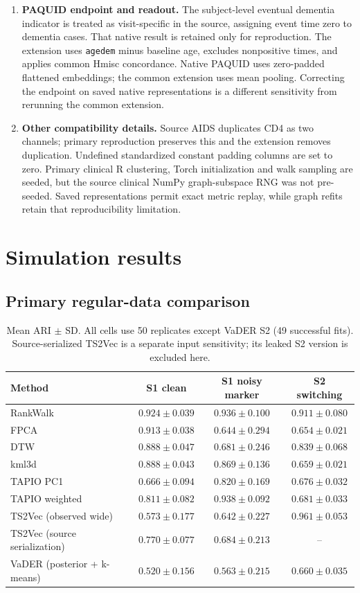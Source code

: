 \documentclass[11pt,a4paper]{article}
\begin{document}
\begin{enumerate}
\item \textbf{PAQUID endpoint and readout.} The subject-level eventual dementia indicator is treated as visit-specific in the source, assigning event time zero to dementia cases. That native result is retained only for reproduction. The extension uses \texttt{agedem} minus baseline age, excludes nonpositive times, and applies common Hmisc concordance. Native PAQUID uses zero-padded flattened embeddings; the common extension uses mean pooling. Correcting the endpoint on saved native representations is a different sensitivity from rerunning the common extension.
\item \textbf{Other compatibility details.} Source AIDS duplicates CD4 as two channels; primary reproduction preserves this and the extension removes duplication. Undefined standardized constant padding columns are set to zero. Primary clinical R clustering, Torch initialization and walk sampling are seeded, but the source clinical NumPy graph-subspace RNG was not pre-seeded. Saved representations permit exact metric replay, while graph refits retain that reproducibility limitation.
\end{enumerate}

\section{Simulation results}
\subsection{Primary regular-data comparison}


\begin{table}[htbp]
\centering\small
\caption{Mean ARI $\pm$ SD. All cells use 50 replicates except VaDER S2 (49 successful fits). Source-serialized TS2Vec is a separate input sensitivity; its leaked S2 version is excluded here.}
\begin{tabular}{lccc}\toprule
Method & S1 clean & S1 noisy marker & S2 switching \\ \midrule
RankWalk & $0.924 \pm 0.039$ & $0.936 \pm 0.100$ & $0.911 \pm 0.080$ \\
FPCA & $0.913 \pm 0.038$ & $0.644 \pm 0.294$ & $0.654 \pm 0.021$ \\
DTW & $0.888 \pm 0.047$ & $0.681 \pm 0.246$ & $0.839 \pm 0.068$ \\
kml3d & $0.888 \pm 0.043$ & $0.869 \pm 0.136$ & $0.659 \pm 0.021$ \\
TAPIO PC1 & $0.666 \pm 0.094$ & $0.820 \pm 0.169$ & $0.676 \pm 0.032$ \\
TAPIO weighted & $0.811 \pm 0.082$ & $0.938 \pm 0.092$ & $0.681 \pm 0.033$ \\
TS2Vec (observed wide) & $0.573 \pm 0.177$ & $0.642 \pm 0.227$ & $0.961 \pm 0.053$ \\
TS2Vec (source serialization) & $0.770 \pm 0.077$ & $0.684 \pm 0.213$ & -- \\
VaDER (posterior + k-means) & $0.520 \pm 0.156$ & $0.563 \pm 0.215$ & $0.660 \pm 0.035$ \\
\bottomrule\end{tabular}
\end{table}
\end{document}
